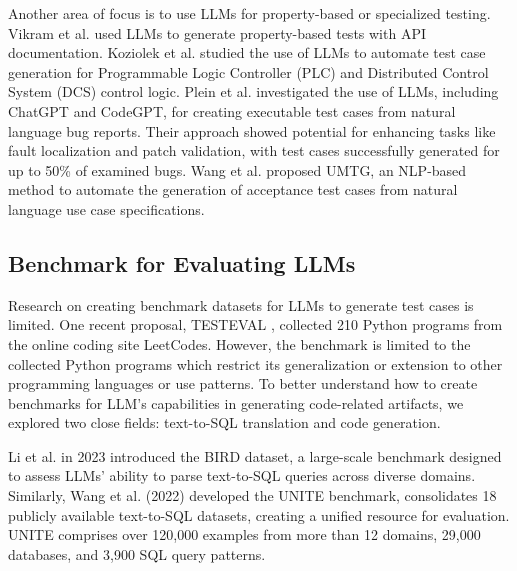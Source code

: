 Another area of focus is to use LLMs for property-based or specialized testing. Vikram et al. \cite{vikram_2023_can} used LLMs to generate property-based tests with API documentation. Koziolek et al. \cite{koziolek_2024_automated} studied the use of LLMs to automate test case generation for Programmable Logic Controller (PLC) and Distributed Control System (DCS) control logic. Plein et al. \cite{plein_2024_automatic}  investigated the use of LLMs, including ChatGPT and CodeGPT, for creating executable test cases from natural language bug reports. Their approach showed potential for enhancing tasks like fault localization and patch validation, with test cases successfully generated for up to 50\% of examined bugs. Wang et al. \cite{wang_2019_automatic} proposed UMTG, an NLP-based method to automate the generation of acceptance test cases from natural language use case specifications.


\subsection{Benchmark for Evaluating LLMs}

Research on creating benchmark datasets for LLMs to generate test cases is limited. One recent proposal, TESTEVAL \cite{wang_2024_testeval}, collected 210 Python programs from the online coding site LeetCodes. However, the benchmark is limited to the collected Python programs which restrict its generalization or extension to other programming languages or use patterns. To better understand how to create benchmarks for LLM’s capabilities in generating code-related artifacts, we explored two close fields: text-to-SQL translation and code generation. 

Li et al. \cite{li_2023_can} in 2023 introduced the BIRD dataset, a large-scale benchmark designed to assess LLMs' ability to parse text-to-SQL queries across diverse domains. Similarly, Wang et al. (2022) \cite{lan_2023_unite} developed the UNITE benchmark, consolidates 18 publicly available text-to-SQL datasets, creating a unified resource for evaluation. UNITE comprises over 120,000 examples from more than 12 domains, 29,000 databases, and 3,900 SQL query patterns. 


